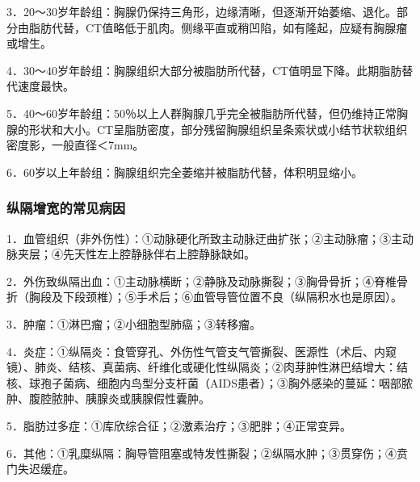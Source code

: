 3．20～30岁年龄组：胸腺仍保持三角形，边缘清晰，但逐渐开始萎缩、退化。部分由脂肪代替，CT值略低于肌肉。侧缘平直或稍凹陷，如有隆起，应疑有胸腺瘤或增生。

4．30～40岁年龄组：胸腺组织大部分被脂肪所代替，CT值明显下降。此期脂肪替代速度最快。

5．40～60岁年龄组：50％以上人群胸腺几乎完全被脂肪所代替，但仍维持正常胸腺的形状和大小。CT呈脂肪密度，部分残留胸腺组织呈条索状或小结节状软组织密度影，一般直径＜7mm。

6．60岁以上年龄组：胸腺组织完全萎缩并被脂肪代替，体积明显缩小。

\subsubsection{纵隔增宽的常见病因}

1．血管组织（非外伤性）：①动脉硬化所致主动脉迂曲扩张；②主动脉瘤；③主动脉夹层；④先天性左上腔静脉伴右上腔静脉缺如。

2．外伤致纵隔出血：①主动脉横断；②静脉及动脉撕裂；③胸骨骨折；④脊椎骨折（胸段及下段颈椎）；⑤手术后；⑥血管导管位置不良（纵隔积水也是原因）。

3．肿瘤：①淋巴瘤；②小细胞型肺癌；③转移瘤。

4．炎症：①纵隔炎：食管穿孔、外伤性气管支气管撕裂、医源性（术后、内窥镜）、肺炎、结核、真菌病、纤维化或硬化性纵隔炎；②肉芽肿性淋巴结增大：结核、球孢子菌病、细胞内鸟型分支杆菌（AIDS患者）；③胸外感染的蔓延：咽部脓肿、腹腔脓肿、胰腺炎或胰腺假性囊肿。

5．脂肪过多症：①库欣综合征；②激素治疗；③肥胖；④正常变异。

6．其他：①乳糜纵隔：胸导管阻塞或特发性撕裂；②纵隔水肿；③贯穿伤；④贲门失迟缓症。

\subsubsection{}


